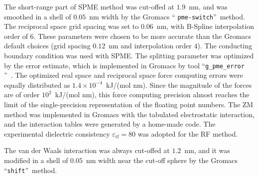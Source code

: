 \documentclass[a4paper,preprint,unsortedaddress,onecolumn,fleqn]{revtex4}
\newcommand{\recheck}[1]{{\color{red} #1}}
\begin{document}


The short-range part of SPME method was cut-offed at $1.9$~nm, and was
smoothed in a shell of $0.05$~nm width by the Gromacs \textquotedblleft 
\texttt{pme-switch}\textquotedblright\ method. The reciprocal space grid
spacing was set to $0.06$~nm, with B-Spline interpolation order of $6$.
These parameters were chosen to be more accurate than the Gromacs default
choices (grid spacing $0.12$~nm and interpolation order $4$).
The conducting boundary condition was used with SPME.
The splitting parameter was optimized by the error estimate, which is
implemented in Gromacs by tool \textquotedblleft \texttt{g\_pme\_error}%
\textquotedblright ~\cite{wang2010optimizing}. The optimized real space and
reciprocal space force computing errors were equally distributed as $%
1.4\times 10^{-4}$~kJ/(mol nm). Since the magnitude of the forces are of
order $10^{2}$~kJ/(mol nm), this force computing precision almost reaches
the limit of the single-precision representation of the floating point
numbers. %
\recheck{The ZM method was implemented in Gromacs with the tabulated electrostatic
interaction, and the interaction tables were generated by a home-made code.
The experimental dielectric consistency  $\varepsilon _{\text{rf}}=80$
was adopted for the RF method.}


The van der Waals interaction was always cut-offed at $1.2$~nm, and it was
modified in a shell of $0.05$~nm width near the cut-off sphere by the
Gromacs \textquotedblleft \texttt{shift}\textquotedblright\ method.
\end{document}
